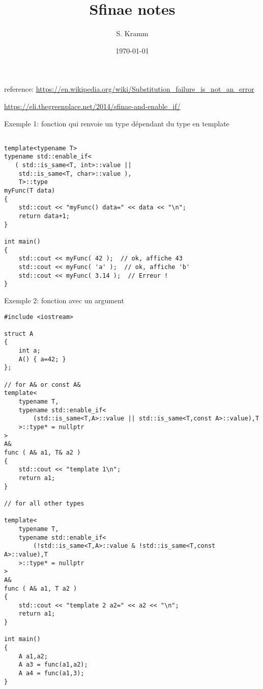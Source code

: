 \documentclass[11pt,a4paper]{article}
\author{S. Kramm}
\title{Sfinae notes}
\date{\today}
\begin{document}
\maketitle

reference: \url{https://en.wikipedia.org/wiki/Substitution_failure_is_not_an_error}


\url{https://eli.thegreenplace.net/2014/sfinae-and-enable_if/}



Exemple 1: fonction qui renvoie un type dépendant du type en template

\begin{lstlisting}

template<typename T>
typename std::enable_if<
   ( std::is_same<T, int>::value ||
    std::is_same<T, char>::value ),
    T>::type
myFunc(T data)
{
	std::cout << "myFunc() data=" << data << "\n";
	return data+1;
}

int main()
{
    std::cout << myFunc( 42 );  // ok, affiche 43
    std::cout << myFunc( 'a' );  // ok, affiche 'b'
    std::cout << myFunc( 3.14 );  // Erreur !        
}

\end{lstlisting}



Exemple 2: fonction avec un argument

\begin{lstlisting}
#include <iostream>

struct A
{
    int a;
    A() { a=42; }
};

// for A& or const A&
template<
	typename T,
	typename std::enable_if<
		(std::is_same<T,A>::value || std::is_same<T,const A>::value),T
	>::type* = nullptr
> 
A&
func ( A& a1, T& a2 )
{
    std::cout << "template 1\n";
    return a1;
}

// for all other types

template<
	typename T,
	typename std::enable_if<
		(!std::is_same<T,A>::value & !std::is_same<T,const A>::value),T
	>::type* = nullptr
> 
A&
func ( A& a1, T a2 )
{
    std::cout << "template 2 a2=" << a2 << "\n";
    return a1;
}
 
int main()
{
    A a1,a2;
    A a3 = func(a1,a2);
    A a4 = func(a1,3);
}
\end{lstlisting}
\end{document}
